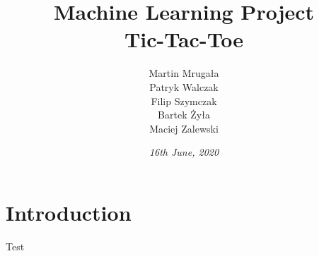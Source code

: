 \documentclass[a4paper,12pt]{book}
\begin{document}
	
	\author{Martin Mrugała\\Patryk Walczak\\Filip Szymczak\\Bartek Żyła\\Maciej Zalewski}
	\title{\Huge{\bf{Machine Learning Project\\Tic-Tac-Toe}}}
	\date{\emph{16th June, 2020}}
	
	\frontmatter
	\maketitle
	\tableofcontents
	
	\mainmatter
	\chapter{\Huge{Introduction}}
	Test
	
	\backmatter
	
\end{document}
